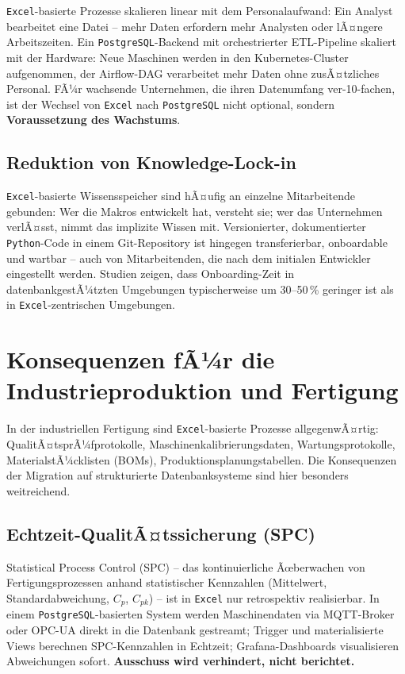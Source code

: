 ﻿\documentclass[12pt,a4paper]{report}
\theoremstyle{definition}
\theoremstyle{remark}
\newcommand{\excel}{\texttt{Excel}}
\newcommand{\pg}{\texttt{PostgreSQL}}
\newcommand{\py}{\texttt{Python}}
\begin{document}
\excel-basierte Prozesse skalieren linear mit dem Personalaufwand:
Ein Analyst bearbeitet eine Datei -- mehr Daten erfordern mehr
Analysten oder lÃ¤ngere Arbeitszeiten.
Ein \pg-Backend mit orchestrierter ETL-Pipeline skaliert mit der
Hardware: Neue Maschinen werden in den Kubernetes-Cluster aufgenommen,
der Airflow-DAG verarbeitet mehr Daten ohne zusÃ¤tzliches Personal.
FÃ¼r wachsende Unternehmen, die ihren Datenumfang ver-10-fachen, ist
der Wechsel von \excel{} nach \pg{} nicht optional, sondern
\textbf{Voraussetzung des Wachstums}.

\subsection{Reduktion von Knowledge-Lock-in}

\excel-basierte Wissensspeicher sind hÃ¤ufig an einzelne Mitarbeitende
gebunden: Wer die Makros entwickelt hat, versteht sie; wer das
Unternehmen verlÃ¤sst, nimmt das implizite Wissen mit.
Versionierter, dokumentierter \py-Code in einem Git-Repository ist
hingegen transferierbar, onboardable und wartbar -- auch von
Mitarbeitenden, die nach dem initialen Entwickler eingestellt werden.
Studien zeigen, dass Onboarding-Zeit in datenbankgestÃ¼tzten
Umgebungen typischerweise um 30--50\,\% geringer ist als in
\excel-zentrischen Umgebungen.

\section{Konsequenzen fÃ¼r die Industrieproduktion und Fertigung}

In der industriellen Fertigung sind \excel-basierte Prozesse
allgegenwÃ¤rtig: QualitÃ¤tsprÃ¼fprotokolle, Maschinenkalibrierungsdaten,
Wartungsprotokolle, MaterialstÃ¼cklisten (BOMs),
Produktionsplanungstabellen.
Die Konsequenzen der Migration auf strukturierte Datenbanksysteme
sind hier besonders weitreichend.

\subsection{Echtzeit-QualitÃ¤tssicherung (SPC)}

Statistical Process Control (SPC) -- das kontinuierliche Ãœberwachen
von Fertigungsprozessen anhand statistischer Kennzahlen (Mittelwert,
Standardabweichung, $C_p$, $C_{pk}$) -- ist in \excel{} nur
retrospektiv realisierbar.
In einem \pg-basierten System werden Maschinendaten via MQTT-Broker
oder OPC-UA direkt in die Datenbank gestreamt; Trigger und
materialisierte Views berechnen SPC-Kennzahlen in Echtzeit;
Grafana-Dashboards visualisieren Abweichungen sofort.
\textbf{Ausschuss wird verhindert, nicht berichtet.}
\end{document}
